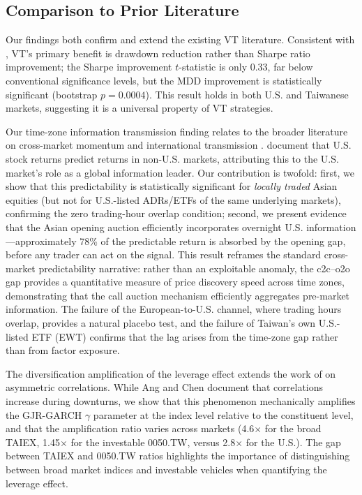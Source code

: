 \subsection{Comparison to Prior Literature}

Our findings both confirm and extend the existing VT literature. Consistent with \citet{moreira2017}, VT's primary benefit is drawdown reduction rather than Sharpe ratio improvement; the Sharpe improvement $t$-statistic is only 0.33, far below conventional significance levels, but the MDD improvement is statistically significant (bootstrap $p = 0.0004$). This result holds in both U.S. and Taiwanese markets, suggesting it is a universal property of VT strategies.

Our time-zone information transmission finding relates to the broader literature on cross-market momentum and international transmission \citep{eun1989}. \citet{rapach2013} document that U.S. stock returns predict returns in non-U.S. markets, attributing this to the U.S. market's role as a global information leader. Our contribution is twofold: first, we show that this predictability is statistically significant for \textit{locally traded} Asian equities (but not for U.S.-listed ADRs/ETFs of the same underlying markets), confirming the zero trading-hour overlap condition; %
second, we present evidence that the Asian opening auction efficiently incorporates overnight U.S. information---approximately 78\% of the predictable return is absorbed by the opening gap, before any trader can act on the signal. This result reframes the standard cross-market predictability narrative: rather than an exploitable anomaly, the c2c--o2o gap provides a quantitative measure of price discovery speed across time zones, demonstrating that the call auction mechanism efficiently aggregates pre-market information. The failure of the European-to-U.S. channel, where trading hours overlap, provides a natural placebo test, and the failure of Taiwan's own U.S.-listed ETF (EWT) confirms that the lag arises from the time-zone gap rather than from factor exposure.

The diversification amplification of the leverage effect extends the work of \citet{ang2002} on asymmetric correlations. While Ang and Chen document that correlations increase during downturns, we show that this phenomenon mechanically amplifies the GJR-GARCH $\gamma$ parameter at the index level relative to the constituent level, and that the amplification ratio varies across markets (4.6$\times$ for the broad TAIEX, 1.45$\times$ for the investable 0050.TW, versus 2.8$\times$ for the U.S.). The gap between TAIEX and 0050.TW ratios highlights the importance of distinguishing between broad market indices and investable vehicles when quantifying the leverage effect.

